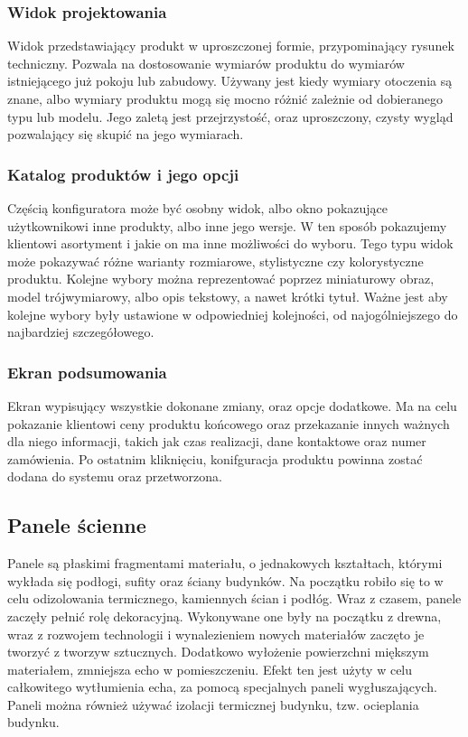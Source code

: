\documentclass{article} %
\begin{document}
        \subsubsection{Widok projektowania}
        Widok przedstawiający produkt w uproszczonej formie, przypominający rysunek techniczny. Pozwala na dostosowanie wymiarów produktu do wymiarów istniejącego już pokoju lub zabudowy. Używany jest kiedy wymiary otoczenia są znane, albo wymiary produktu mogą się mocno różnić zależnie od dobieranego typu lub modelu. Jego zaletą jest przejrzystość, oraz uproszczony, czysty wygląd pozwalający się skupić na jego wymiarach.
        \\
        
        \subsubsection{Katalog produktów i jego opcji}
        Częścią konfiguratora może być osobny widok, albo okno pokazujące użytkownikowi inne produkty, albo inne jego wersje. W ten sposób pokazujemy klientowi asortyment i jakie on ma inne możliwości do wyboru. Tego typu widok może pokazywać różne warianty rozmiarowe, stylistyczne czy kolorystyczne produktu. Kolejne wybory można reprezentować poprzez miniaturowy obraz, model trójwymiarowy, albo opis tekstowy, a nawet krótki tytuł. Ważne jest aby kolejne wybory były ustawione w odpowiedniej kolejności, od najogólniejszego do najbardziej szczegółowego.
        \\
        
        \subsubsection{Ekran podsumowania}
        Ekran wypisujący wszystkie dokonane zmiany, oraz opcje dodatkowe. Ma na celu pokazanie klientowi ceny produktu końcowego oraz przekazanie innych ważnych dla niego informacji, takich jak czas realizacji, dane kontaktowe oraz numer zamówienia. Po ostatnim kliknięciu, konifguracja produktu powinna zostać dodana do systemu oraz przetworzona.
        \\
        
        
    \subsection{Panele ścienne}
        Panele są płaskimi fragmentami materiału, o jednakowych kształtach, którymi wykłada się podłogi, sufity oraz ściany budynków. Na początku robiło się to w celu odizolowania termicznego, kamiennych ścian i podłóg. Wraz z czasem, panele zaczęły pełnić rolę dekoracyjną. Wykonywane one były na początku z drewna, wraz z rozwojem technologii i wynalezieniem nowych materiałów zaczęto je tworzyć z tworzyw sztucznych. Dodatkowo wyłożenie powierzchni miększym materiałem, zmniejsza echo w pomieszczeniu. Efekt ten jest użyty w celu całkowitego wytłumienia echa, za pomocą specjalnych paneli wygłuszających. Paneli można również używać izolacji termicznej budynku, tzw. ocieplania budynku. 
        \\
        
\end{document}
